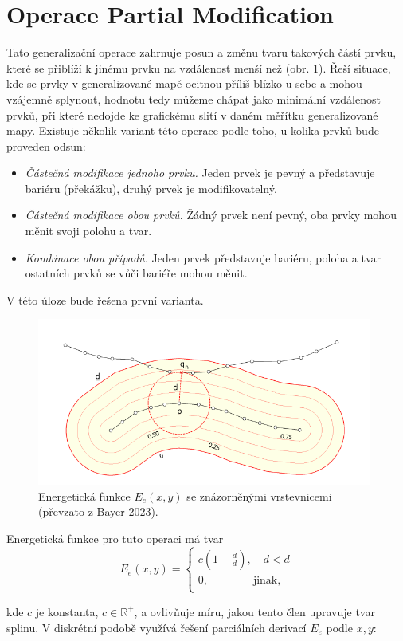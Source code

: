 \section*{Operace Partial Modification}
\par Tato generalizační operace zahrnuje posun a změnu tvaru takových částí prvku, které se přiblíží k jinému prvku na vzdálenost menší než  (obr. 1). Řeší situace, kde se prvky v generalizované mapě ocitnou příliš blízko u sebe a mohou vzájemně splynout, hodnotu  tedy můžeme chápat jako minimální vzdálenost prvků, při které nedojde ke grafickému slití v daném měřítku generalizované mapy. Existuje několik variant této operace podle toho, u kolika prvků bude proveden odsun:
\begin{itemize}
    \item \emph{Částečná modifikace jednoho prvku.} Jeden prvek je pevný a představuje bariéru (překážku), druhý prvek je modifikovatelný.
    \item \emph{Částečná modifikace obou prvků.} Žádný prvek není pevný, oba prvky mohou měnit svoji polohu a tvar.
    \item \emph{Kombinace obou případů.} Jeden prvek představuje bariéru, poloha a tvar ostatních prvků se vůči bariéře mohou měnit.
\end{itemize}
\par V této úloze bude řešena první varianta.
\begin{figure}[H]
\centering
\includegraphics[width=11cm]{images/spline.png} 
    \caption{Energetická funkce $E_e(x,y)$ se znázorněnými vrstevnicemi (převzato z Bayer 2023).}
\end{figure}
\par Energetická funkce pro tuto operaci má tvar
\begin{equation*}
E_e(x, y) = \begin{cases}
    c(1-\frac{d}{\underline{\textit{d}}}), \quad d < \underline{\textit{d}}\\
    0, \quad \quad \qquad \text{jinak},\\
    \end{cases}
\end{equation*}
\par kde $c$ je konstanta, $c \in \mathbb{R}^+$, a ovlivňuje míru, jakou tento člen upravuje tvar splinu. V diskrétní podobě využívá řešení parciálních derivací $E_e$ podle $x, y$:

